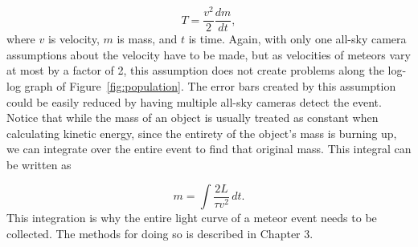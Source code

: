 \begin{equation}
	T = \frac{v^2}{2}\frac{dm}{dt},
\end{equation}
where $v$ is velocity, $m$ is mass, and $t$ is time. Again, with only one all-sky camera assumptions about the velocity have to be made, but as velocities of meteors vary at most by a factor of 2, this assumption does not create problems along the log-log graph of Figure~\ref{fig:population}. The error bars created by this assumption could be easily reduced by having multiple all-sky cameras detect the event. Notice that while the mass of an object is usually treated as constant when calculating kinetic energy, since the entirety of the object's mass is burning up, we can integrate over the entire event to find that original mass. This integral can be written as

\begin{equation}
m =\int \frac{2L}{\tau v^2}\,dt.
\end{equation}
This integration is why the entire light curve of a meteor event needs to be collected. The methods for doing so is described in Chapter 3.
